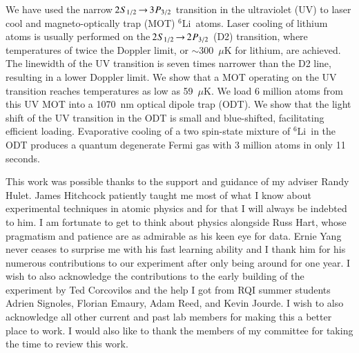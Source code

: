 \documentclass[oneside,12pt]{memoir}
\newcommand{\twos}[1]{\ensuremath{\hspace{-1pt}2\hspace{0.5pt}\hspace{0pt}S_{#1}\hspace{-1pt}}}
\newcommand{\twop}[1]{\ensuremath{\hspace{-1pt}2\hspace{0.5pt}\hspace{0pt}P_{#1}\hspace{-1pt}}}
\newcommand{\trep}[1]{\ensuremath{\hspace{-1pt}3\hspace{0.5pt}\hspace{0pt}P_{#1}\hspace{-1pt}}}
\newcommand{\red}{\ensuremath{ \twos{1/2}\hspace{-0.0pt}\rightarrow\hspace{-0.0pt}\twop{3/2} }\ }
\newcommand{\uv}{\ensuremath{ \twos{1/2}\hspace{-0.0pt}\rightarrow\hspace{-0.0pt}\trep{3/2} }\ }
\newcommand{\li} {\ensuremath{^{6}}Li\ }
\begin{document}
\pagestyle{plain}          %

\frontmatter
\thetitlepage



\riceabstract
\pagestyle{empty}  %
We have used the narrow \uv transition in the ultraviolet (UV) to laser cool
and magneto-optically trap (MOT) \li atoms.  Laser cooling of lithium atoms is
usually performed on the \red (D2) transition, where temperatures of twice the
Doppler limit, or $\sim$300~$\mu$K for lithium, are achieved.  The linewidth of
the UV transition is seven times narrower than the D2 line, resulting in a lower
Doppler limit.  We show that a MOT operating on the UV
transition reaches temperatures as low as 59~$\mu$K.  We load 6 million
atoms from this UV MOT into a 1070~nm optical dipole trap (ODT).  We show that
the light shift of the UV transition in the ODT is small and blue-shifted,
facilitating efficient loading.  Evaporative cooling of a two
spin-state mixture of \li in the ODT produces a quantum degenerate Fermi gas
with 3 million atoms in only 11 seconds.
\pagestyle{plain} %

 
\riceacknowledgements

This work was possible thanks to the support and guidance of my adviser Randy
Hulet.  James Hitchcock patiently taught me most of what I know about
experimental techniques in atomic physics and for that I will always be
indebted to him.  I am fortunate to get to think about physics alongside Russ
Hart, whose pragmatism and patience are as admirable as his keen eye for data.
Ernie Yang never ceases to surprise me with his fast learning ability and I
thank him for his numerous contributions to our experiment after only being
around for one year.  I wish to also acknowledge the contributions to the early
building of the experiment by Ted Corcovilos and the help I got from RQI summer
students Adrien Signoles, Florian Emaury,  Adam Reed, and Kevin Jourde.    I
wish to also acknowledge all other current and past lab members for making this
a better place to work.  I would also like to thank the members of my committee
for taking the time to review this work. 


\end{document}
